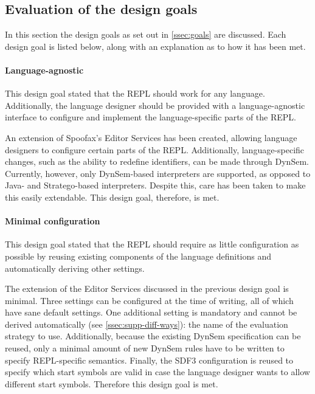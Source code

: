 \subsection{Evaluation of the design goals}
\label{ssec:eval-design-goals}

In this section the design goals as set out in \cref{ssec:goals} are
discussed. Each design goal is listed below, along with an explanation as to how
it has been met.

\paragraph{Language-agnostic} This design goal stated that the REPL should work
for any language. Additionally, the language designer should be provided with a
language-agnostic interface to configure and implement the language-specific
parts of the REPL.

An extension of Spoofax's Editor Services has been created, allowing language
designers to configure certain parts of the REPL. Additionally,
language-specific changes, such as the ability to redefine identifiers, can be
made through DynSem. Currently, however, only DynSem-based interpreters are
supported, as opposed to Java- and Stratego-based interpreters. Despite this,
care has been taken to make this easily extendable. This design goal, therefore,
is met.

\paragraph{Minimal configuration} This design goal stated that the REPL should
require as little configuration as possible by reusing existing components of
the language definitions and automatically deriving other settings.

The extension of the Editor Services discussed in the previous design goal is
minimal. Three settings can be configured at the time of writing, all of which
have sane default settings. One additional setting is mandatory and cannot be
derived automatically (see \cref{ssec:supp-diff-ways}): the name of the
evaluation strategy to use. Additionally, because the existing DynSem
specification can be reused, only a minimal amount of new DynSem rules have to
be written to specify REPL-specific semantics. Finally, the SDF3 configuration
is reused to specify which start symbols are valid in case the language designer
wants to allow different start symbols. Therefore this design goal is met.

